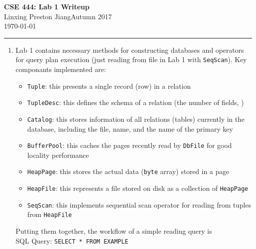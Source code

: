 \documentclass[10pt]{article}
\newcommand{\myname}{Linxing Preston Jiang}
\newcommand{\quarter}{Autumn 2017}
\newcommand{\myhwname}{\textbf{CSE 444: Lab 1 Writeup}}
\begin{document}
\begin{center}
	{\Large \myhwname} \\
	\vspace{.05in}
    \myname\quad\quarter \\
	\vspace{.05in}
    \today \\
\end{center}
\vspace{.15in} \hrule \vspace{0.5em}%

\begin{enumerate}[label=\textbf{\arabic*.}, listparindent=0.0em, itemsep=1em]
	\item
	Lab 1 contains necessary methods for constructing databases and operators for query plan execution (just reading
	from file in Lab 1 with \texttt{SeqScan}). Key componants implemented are:
	\begin{itemize}
		\item \texttt{Tuple}: this presents a single record (row) in a relation
		\item \texttt{TupleDesc}: this defines the schema of a relation (the number of fields, )
		\item \texttt{Catalog}: this stores information of all relations (tables) currently in the database, including the file, name, and the name of the primary key
		\item \texttt{BufferPool}: this caches the pages recently read by \texttt{DbFile} for good locality performance
		\item \texttt{HeapPage}: this stores the actual data (\texttt{byte} array) stored in a page
		\item \texttt{HeapFile}: this represents a file stored on disk as a collection of \texttt{HeapPage}
		\item \texttt{SeqScan}: this implements sequential scan operator for reading from tuples from \texttt{HeapFile}
	\end{itemize}
    Putting them together, the workflow of a simple reading query is \\
    SQL Query: \texttt{SELECT * FROM EXAMPLE} \\


\end{enumerate}
\end{document}
